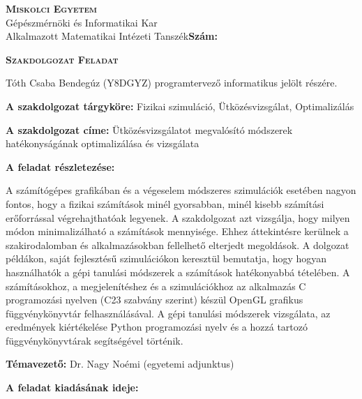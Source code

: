 \noindent
\textsc{\textbf{Miskolci Egyetem}}\\
Gépészmérnöki és Informatikai Kar\\
Alkalmazott Matematikai Intézeti Tanszék\hspace*{4cm}\hfil \textbf{Szám:}

\vspace{0.5cm}
\begin{center}
\large\textsc{\textbf{Szakdolgozat Feladat}}
\end{center}
\vspace{0.5cm}

Tóth Csaba Bendegúz (Y8DGYZ) programtervező informatikus jelölt részére.

\bigskip
\noindent\textbf{A szakdolgozat tárgyköre:} Fizikai szimuláció, Ütközésvizsgálat, Optimalizálás

\bigskip
\noindent\textbf{A szakdolgozat címe:} Ütközésvizsgálatot megvalósító módszerek hatékonyságának optimalizálása és vizsgálata

\bigskip
\noindent\textbf{A feladat részletezése:}

\medskip

A számítógépes grafikában és a végeselem módszeres szimulációk esetében nagyon fontos, hogy a fizikai
számítások minél gyorsabban, minél kisebb számítási erőforrással végrehajthatóak legyenek. A
szakdolgozat azt vizsgálja, hogy milyen módon minimalizálható a számítások mennyisége. Ehhez
áttekintésre kerülnek a szakirodalomban és alkalmazásokban fellelhető elterjedt megoldások. A dolgozat
példákon, saját fejlesztésű szimulációkon keresztül bemutatja, hogy hogyan használhatók a gépi tanulási
módszerek a számítások hatékonyabbá tételében. A számításokhoz, a megjelenítéshez és a szimulációkhoz
az alkalmazás C programozási nyelven (C23 szabvány szerint) készül OpenGL grafikus
függvénykönyvtár felhasználásával. A gépi tanulási módszerek vizsgálata, az eredmények kiértékelése
Python programozási nyelv és a hozzá tartozó függvénykönyvtárak segítségével történik.

\medskip

\vfill

\noindent\textbf{Témavezető:} Dr. Nagy Noémi (egyetemi adjunktus)


\bigskip
\noindent\textbf{A feladat kiadásának ideje:}

